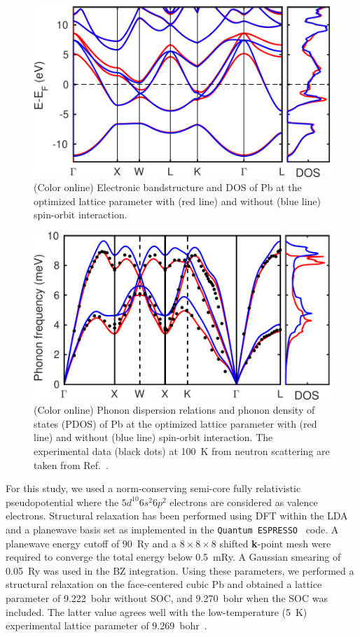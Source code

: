 \documentclass[final,3p,times,twocolumn]{elsarticle}
\newcounter{bla}
\begin{document}
\begin{figure}[t!]
  \centering
  \includegraphics[width=0.99\linewidth]{Pb_BS2.pdf}
  \caption{\label{BS-Pb} (Color online) Electronic bandstructure and DOS of Pb at the optimized lattice parameter with (red line) and without (blue line) spin-orbit interaction.}
\end{figure}
\begin{figure}[t!]
  \centering
  \includegraphics[width=0.99\linewidth]{Pb_phonon_BS5.pdf}
  \caption{\label{PH-Pb} (Color online) Phonon dispersion relations and phonon density of states (PDOS) of Pb at the optimized lattice parameter with (red line) and without (blue line) spin-orbit interaction. The experimental data (black dots) at 100~K from neutron scattering are taken from Ref.~\cite{Brockhouse1962}.}
\end{figure}

For this study, we used a norm-conserving semi-core fully relativistic pseudopotential where the $5d^{10}6s^{2}6p^{2}$ electrons are considered as valence electrons. Structural relaxation has been performed using DFT within the LDA~\cite{Ceperley1980,Perdew1981} and a planewave basis set as implemented in the \texttt{Quantum ESPRESSO}~\cite{Giannozzi2009} code. A planewave energy cutoff of 90~Ry and a $8\times8\times8$ shifted \textbf{k}-point mesh were required to converge the total energy below 0.5~mRy. A Gaussian smearing of 0.05~Ry was used in the BZ integration.
Using these parameters, we performed a structural relaxation on the face-centered cubic Pb and obtained a lattice parameter of 9.222~bohr without SOC, and 9.270~bohr when the SOC was included. The latter value agrees well with the low-temperature (5~K) experimental lattice parameter of 9.269~bohr~\cite{Touloukian1975,Grabowski2007}.    
\end{document}

